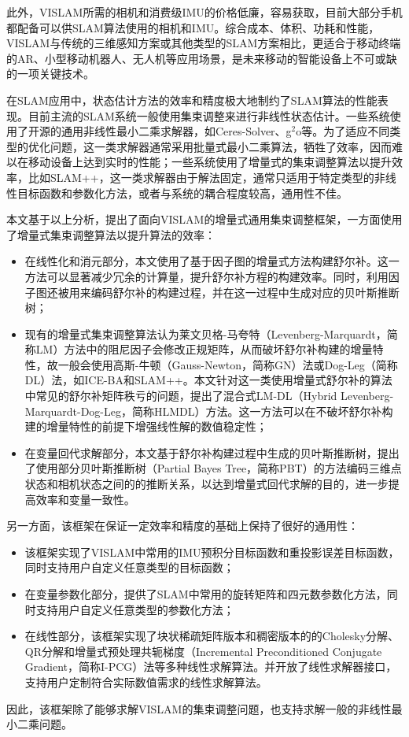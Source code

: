 此外，VISLAM所需的相机和消费级IMU的价格低廉，容易获取，目前大部分手机都配备可以供SLAM算法使用的相机和IMU。综合成本、体积、功耗和性能，VISLAM与传统的三维感知方案或其他类型的SLAM方案相比，更适合于移动终端的AR、小型移动机器人、无人机等应用场景，是未来移动的智能设备上不可或缺的一项关键技术。

在SLAM应用中，状态估计方法的效率和精度极大地制约了SLAM算法的性能表现。目前主流的SLAM系统一般使用集束调整来进行非线性状态估计。一些系统使用了开源的通用非线性最小二乘求解器，如Ceres-Solver\citep{ceres-solver}、g$^2$o\citep{kummerle2011g}等。为了适应不同类型的优化问题，这一类求解器通常采用批量式最小二乘算法，牺牲了效率，因而难以在移动设备上达到实时的性能；一些系统使用了增量式的集束调整算法以提升效率，比如SLAM++\citep{ila2017fast}，这一类求解器由于解法固定，通常只适用于特定类型的非线性目标函数和参数化方法，或者与系统的耦合程度较高，通用性不佳。

本文基于以上分析，提出了面向VISLAM的增量式通用集束调整框架，一方面使用了增量式集束调整算法以提升算法的效率：
\begin{itemize}
    \item 在线性化和消元部分，本文使用了基于因子图的增量式方法构建舒尔补。这一方法可以显著减少冗余的计算量，提升舒尔补方程的构建效率。同时，利用因子图还被用来编码舒尔补的构建过程，并在这一过程中生成对应的贝叶斯推断树；
    \item 现有的增量式集束调整算法认为莱文贝格-马夸特（Levenberg-Marquardt，简称LM）方法中的阻尼因子会修改正规矩阵，从而破坏舒尔补构建的增量特性，故一般会使用高斯-牛顿（Gauss-Newton，简称GN）法或Dog-Leg（简称DL）法，如ICE-BA\citep{liu2018ice}和SLAM++。本文针对这一类使用增量式舒尔补的算法中常见的舒尔补矩阵秩亏的问题，提出了混合式LM-DL（Hybrid Levenberg-Marquardt-Dog-Leg，简称HLMDL）方法。这一方法可以在不破坏舒尔补构建的增量特性的前提下增强线性解的数值稳定性；
    \item 在变量回代求解部分，本文基于舒尔补构建过程中生成的贝叶斯推断树，提出了使用部分贝叶斯推断树（Partial Bayes Tree，简称PBT）的方法编码三维点状态和相机状态之间的的推断关系，以达到增量式回代求解的目的，进一步提高效率和变量一致性。
\end{itemize}

另一方面，该框架在保证一定效率和精度的基础上保持了很好的通用性：
\begin{itemize}
    \item 该框架实现了VISLAM中常用的IMU预积分\citep{forster2017manifold}目标函数和重投影误差目标函数，同时支持用户自定义任意类型的目标函数；
    \item 在变量参数化部分，提供了SLAM中常用的旋转矩阵和四元数参数化方法，同时支持用户自定义任意类型的参数化方法；
    \item 在线性部分，该框架实现了块状稀疏矩阵版本和稠密版本的的Cholesky分解、QR分解和增量式预处理共轭梯度（Incremental Preconditioned Conjugate Gradient，简称I-PCG）法等多种线性求解算法。并开放了线性求解器接口，支持用户定制符合实际数值需求的线性求解算法。
\end{itemize}
因此，该框架除了能够求解VISLAM的集束调整问题，也支持求解一般的非线性最小二乘问题。

